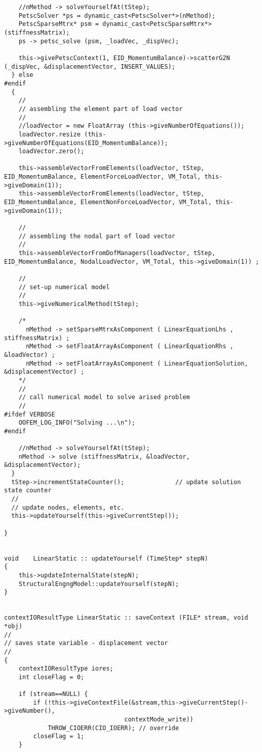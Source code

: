 \documentclass[12pt,draft]{article}
\begin{document}
{\begin{verbatim}
    //nMethod -> solveYourselfAt(tStep);
    PetscSolver *ps = dynamic_cast<PetscSolver*>(nMethod);
    PetscSparseMtrx* psm = dynamic_cast<PetscSparseMtrx*>(stiffnessMatrix);
    ps -> petsc_solve (psm, _loadVec, _dispVec);
    
    this->givePetscContext(1, EID_MomentumBalance)->scatterG2N (_dispVec, &displacementVector, INSERT_VALUES); 
  } else 
#endif
  {
    // 
    // assembling the element part of load vector
    //
    //loadVector = new FloatArray (this->giveNumberOfEquations());
    loadVector.resize (this->giveNumberOfEquations(EID_MomentumBalance)); 
    loadVector.zero();
    
    this->assembleVectorFromElements(loadVector, tStep, EID_MomentumBalance, ElementForceLoadVector, VM_Total, this->giveDomain(1));
    this->assembleVectorFromElements(loadVector, tStep, EID_MomentumBalance, ElementNonForceLoadVector, VM_Total, this->giveDomain(1));
    
    // 
    // assembling the nodal part of load vector
    //
    this->assembleVectorFromDofManagers(loadVector, tStep, EID_MomentumBalance, NodalLoadVector, VM_Total, this->giveDomain(1)) ;
    
    //
    // set-up numerical model
    //
    this->giveNumericalMethod(tStep);
    
    /*
      nMethod -> setSparseMtrxAsComponent ( LinearEquationLhs , stiffnessMatrix) ; 
      nMethod -> setFloatArrayAsComponent ( LinearEquationRhs , &loadVector) ; 
      nMethod -> setFloatArrayAsComponent ( LinearEquationSolution, &displacementVector) ;
    */
    // 
    // call numerical model to solve arised problem
    //
#ifdef VERBOSE
    OOFEM_LOG_INFO("Solving ...\n");
#endif
    
    //nMethod -> solveYourselfAt(tStep);
    nMethod -> solve (stiffnessMatrix, &loadVector, &displacementVector);
  }
  tStep->incrementStateCounter();              // update solution state counter
  //
  // update nodes, elements, etc.
  this->updateYourself(this->giveCurrentStep());
  
} 


void    LinearStatic :: updateYourself (TimeStep* stepN) 
{
	this->updateInternalState(stepN);
	StructuralEngngModel::updateYourself(stepN);
}


contextIOResultType LinearStatic :: saveContext (FILE* stream, void *obj)
// 
// saves state variable - displacement vector
//
{
	contextIOResultType iores;
	int closeFlag = 0;

	if (stream==NULL) {
		if (!this->giveContextFile(&stream,this->giveCurrentStep()->giveNumber(),
	                             contextMode_write)) 
			THROW_CIOERR(CIO_IOERR); // override 
		closeFlag = 1;
	}


\end{verbatim}}
\end{document}
